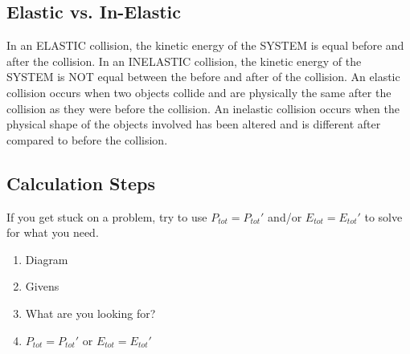 \begin{adjustwidth}{1cm}{0pt}
    \subsection*{Elastic vs. In-Elastic}
    \begin{adjustwidth}{0.5cm}{0pt}
        In an ELASTIC collision, the kinetic energy of the SYSTEM is equal before and after the collision.  In an INELASTIC collision, the kinetic energy of the SYSTEM is NOT equal between the before and after of the collision.\newline\newline
        An elastic collision occurs when two objects collide and are physically the same after the collision as they were before the collision. An inelastic collision occurs when the physical shape of the objects involved has been altered and is different after compared to before the collision.
    \end{adjustwidth}
    \subsection*{Calculation Steps}
    \begin{flushleft}
        If you get stuck on a problem, try to use $P_{tot} = P_{tot}\prime$ and/or $E_{tot} = E_{tot}\prime$ to solve for what you need.
    \end{flushleft}
    \vspace*{5pt}
    \begin{adjustwidth}{0.5cm}{0pt}
        \begin{enumerate}
            \item Diagram
            \item Givens
            \item What are you looking for?
            \item $P_{tot} = P_{tot}\prime$ or $E_{tot} = E_{tot}\prime$
        \end{enumerate}
    \end{adjustwidth}
\end{adjustwidth}